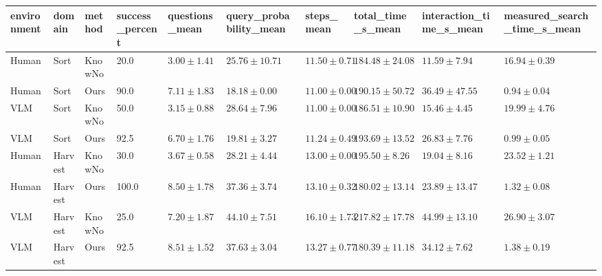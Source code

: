 \begin{tabular}{llllllllll}
\hline
environment & domain & method & success\_percent & questions\_mean & query\_probability\_mean & steps\_mean & total\_time\_s\_mean & interaction\_time\_s\_mean & measured\_search\_time\_s\_mean \\
\hline
Human & Sort & KnowNo & 20.0 & $3.00 \pm 1.41$ & $25.76 \pm 10.71$ & $11.50 \pm 0.71$ & $184.48 \pm 24.08$ & $11.59 \pm 7.94$ & $16.94 \pm 0.39$ \\
Human & Sort & Ours & 90.0 & $7.11 \pm 1.83$ & $18.18 \pm 0.00$ & $11.00 \pm 0.00$ & $190.15 \pm 50.72$ & $36.49 \pm 47.55$ & $0.94 \pm 0.04$ \\
VLM & Sort & KnowNo & 50.0 & $3.15 \pm 0.88$ & $28.64 \pm 7.96$ & $11.00 \pm 0.00$ & $186.51 \pm 10.90$ & $15.46 \pm 4.45$ & $19.99 \pm 4.76$ \\
VLM & Sort & Ours & 92.5 & $6.70 \pm 1.76$ & $19.81 \pm 3.27$ & $11.24 \pm 0.49$ & $193.69 \pm 13.52$ & $26.83 \pm 7.76$ & $0.99 \pm 0.05$ \\
Human & Harvest & KnowNo & 30.0 & $3.67 \pm 0.58$ & $28.21 \pm 4.44$ & $13.00 \pm 0.00$ & $195.50 \pm 8.26$ & $19.04 \pm 8.16$ & $23.52 \pm 1.21$ \\
Human & Harvest & Ours & 100.0 & $8.50 \pm 1.78$ & $37.36 \pm 3.74$ & $13.10 \pm 0.32$ & $180.02 \pm 13.14$ & $23.89 \pm 13.47$ & $1.32 \pm 0.08$ \\
VLM & Harvest & KnowNo & 25.0 & $7.20 \pm 1.87$ & $44.10 \pm 7.51$ & $16.10 \pm 1.73$ & $217.82 \pm 17.78$ & $44.99 \pm 13.10$ & $26.90 \pm 3.07$ \\
VLM & Harvest & Ours & 92.5 & $8.51 \pm 1.52$ & $37.63 \pm 3.04$ & $13.27 \pm 0.77$ & $180.39 \pm 11.18$ & $34.12 \pm 7.62$ & $1.38 \pm 0.19$ \\
\hline
\end{tabular}
